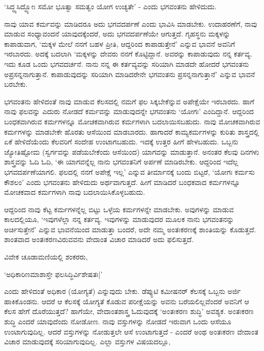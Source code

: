 `ಸಿದ್ಧ್ಯಸಿದ್ಧ್ಯೋಃ ಸಮೋ ಭೂತ್ವಾ ಸಮತ್ವಂ ಯೋಗ ಉಚ್ಯತೇ' - ಎಂದು ಭಗವಂತನು ಹೇಳಿದುದು.

ನಾವು ಯಾವ ಕರ್ಮವನ್ನು ಮಾಡಿದರೂ ಅದು ಭಗವದರ್ಪಣೆ ಎಂದು ಭಾವಿಸಿ ಮಾಡಬೇಕು. ಉದಾಹರಣೆಗೆ, ನಾವು ಮಾಡುವ ಸಂಧ್ಯಾವಂದನೆ ಯಾವುದಕ್ಕೆಂದರೆ, ಅದು ಭಗವದರ್ಪಣೆಯೇ ಆಗುತ್ತದೆ. ಗೃಹಸ್ಥನು ಮಕ್ಕಳನ್ನು ಕಾಪಾಡುವಾಗ, `ಮಕ್ಕಳ ಮೇಲೆ ನನಗೆ ಬಹಳ ಪ್ರೀತಿ, ಆದ್ದರಿಂದ ಕಾಪಾಡುತ್ತೇನೆ' ಎನ್ನುವ ಭಾವನೆ ಅವನಿಗೆ ಇರಬಾರದು. ಅದಕ್ಕೆ ಬದಲಾಗಿ `ಮಕ್ಕಳನ್ನು ದೇವರು ನನಗೆ ಕೊಟ್ಟಿದ್ದಾನೆ. ಅವರನ್ನು ಕಾಪಾಡುವುದು ನನ್ನ ಕರ್ತವ್ಯ. ಇದು ಕೂಡ ಒಂದು ಭಗವದರ್ಚನೆ. ನಾನು ನನ್ನ ಈ ಕರ್ತವ್ಯವನ್ನು ಸರಿಯಾಗಿ ಮಾಡದೇ ಹೋದರೆ ಭಗವಂತನು ಅಪ್ರಸನ್ನನಾಗುತ್ತಾನೆ. ಕಾಪಾಡುವುದನ್ನು ಸರಿಯಾಗಿ ಮಾಡಿದರೇನೇ ಭಗವಂತನು ಪ್ರಸನ್ನನಾಗುತ್ತಾನೆ' ಎನ್ನುವ ಭಾವನೆ ಬರಬೇಕು. 

ಭಗವಂತನು ಹೇಳಿದಂತೆ ನಾವು ಮಾಡುವ ಕೆಲಸದಲ್ಲಿ ನಮಗೆ ಫಲ ಸಿಕ್ಕಬೇಕೆನ್ನುವ ಅಪೇಕ್ಷೆಯೇ ಇರಬಾರದು. ಹಾಗೆ ನಾವು ಫಲವನ್ನು ಎದುರು ನೋಡದೆ ಕರ್ಮವನ್ನು ಮಾಡುವುದನ್ನೇ ಭಗವಂತನು `ಯೋಗಃ' ಎಂದಿದ್ದಾನೆ. ಆದ್ದರಿಂದ ಬಂಧಕವಾಗಿರುವ ಕರ್ಮಗಳನ್ನೂ ಮೋಚಕವಾಗಿರುವ ಕರ್ಮಗಳಾಗಿ ಬದಲಾಯಿಸಬಹುದು. ನಾವು ಮೋಚಕವಾಗಿರುವ ಕರ್ಮಗಳನ್ನು ಮಾಡಬೇಕೇ ಹೊರತು ಆಸೆಯಿಂದ ಮಾಡಬಾರದು. ಹಾಗಾದರೆ ಕಾಮ್ಯಕರ್ಮಗಳನ್ನು ಕುರಿತು ಶಾಸ್ತ್ರದಲ್ಲಿ ಏಕೆ ಹೇಳಿದೆಯೆಂದು ಕೆಲವರಿಗೆ ಸಂದೇಹ ಉಂಟಾಗಬಹುದು. ಇದಕ್ಕೆ  ಉತ್ತರ ಹೀಗೆ ಹೇಳಬಹುದು. ಒಬ್ಬನು ಜ್ಯೋತಿಷ್ಟೋಮ (ಸ್ವರ್ಗವನ್ನು ಪಡೆಯಬೇಕೆಂದು ಆಸೆಯಿಂದ) ಯಾಗವನ್ನು ಮಾಡುತ್ತಾನೆ. ಅನಂತರ ಕೆಲವು ದಿನಗಳು ಶಾಸ್ತ್ರವನ್ನು ಓದಿ ಓದಿ, `ಈ ಯಾಗವನ್ನೆಲ್ಲ ನಾನು ಭಗವಂತನಿಗೆ ಅರ್ಪಣೆ ಮಾಡಿರಬೇಕು. ಆದ್ದರಿಂದ ಇದೆಲ್ಲ ಭಗವದರ್ಪಣೆಯಾಗಲಿ. ಫಲದಲ್ಲಿ ನನಗೆ ಅಪೇಕ್ಷೆ ಇಲ್ಲ' ಎನ್ನುವ ತೀರ್ಮಾನಕ್ಕೆ ಬಂದು ಬಿಟ್ಟರೆ, `ಯೋಗಃ ಕರ್ಮಸು ಕೌಶಲಂ' ಎಂದು ಭಗವಂತನು ಹೇಳಿದುದು ಅರ್ಥವಾಗುತ್ತದೆ. ಹೀಗೆ ಮಾಡಿದರೆ ಬಂಧಕವಾದ ಕರ್ಮಗಳನ್ನೂ ಮೋಚಕವಾದ ಕರ್ಮಗಳಾಗಿ ನಾವು ಬದಲಾಯಿಸಿಕೊಳ್ಳಬಹುದು.

ಆದ್ದರಿಂದ ನಾವು ಕೆಟ್ಟ ಕರ್ಮಗಳನ್ನೆಲ್ಲ ಬಿಟ್ಟು ಒಳ್ಳೆಯ ಕರ್ಮಗಳನ್ನೇ ಮಾಡಬೇಕು. ಅವುಗಳನ್ನು ಮಾಡುವ ಕಾಲದಲ್ಲಿಯೂ, `ಇವುಗಳೆಲ್ಲಾ ನನ್ನ ಕರ್ತವ್ಯ. ಇವುಗಳನ್ನು ಮಾಡುವುದರ ಮೂಲಕ ನಾನು ಭಗವಂತನನ್ನು ಅರ್ಚಿಸುತ್ತೇನೆ' ಎನ್ನುವ ಭಾವನೆಯಿಂದ ಮಾಡುತ್ತಾ ಬಂದರೆ, ಅದೇ ನಮ್ಮ ಅಂತಃಕರಣಕ್ಕೆ ಶಾಂತಿಯನ್ನು ಕೊಡುತ್ತದೆ. ಶಾಂತವಾದ ಅಂತಃಕರಣವಿರುವವನು ವೇದಾಂತ ವಿಚಾರ ಮಾಡಿದರೆ ಅದು ಫಲಿಸುತ್ತದೆ.

ವಿವೇಕ ಚೂಡಾಮಣಿಯಲ್ಲಿ ಶಂಕರರು,

\begin{shloka}
`ಅಧಿಕಾರಿಣಮಾಶಾಸ್ತೇ ಫಲಸಿದ್ಧಿರ್ವಿಶೇಷತಃ|'
\end{shloka}

ಎಂದು ಹೇಳಿದಂತೆ ಅಧಿಕಾರ (ಯೋಗ್ಯತೆ) ಎನ್ನುವುದು ಬೇಕು. ಡೆಪ್ಯುಟಿ ಕಮೀಷನರ್ ಕೆಲಸಕ್ಕೆ ಒಬ್ಬನು ಅರ್ಜಿ ಹಾಕಿಕೊಂಡನು. ಆದರೆ ಆ ಕೆಲಸಕ್ಕೆ ಯೋಗ್ಯತೆ ಕೊಡುವ ಪರೀಕ್ಷೆಯನ್ನು ಅವನು ಬರೆಯಲಿಲ್ಲವೆಂದರೆ ಅವನಿಗೆ ಆ ಕೆಲಸ ಹೇಗೆ ದೊರೆಯುತ್ತದೆ? ಹಾಗೆಯೇ, ವೇದಾಂತಶಾಸ್ತ್ರ ಓದುವುದಕ್ಕೆ `ಅಂತಃಕರಣ ಶುದ್ಧಿ' ಅವಶ್ಯಕ. ಅಂತಃಕರಣ ಶುದ್ಧಿ ಎಂದರೆ ಯಾವುದೆಂದು ನೋಡೋಣ. ನಾವು ವಸ್ತುಗಳನ್ನು ನೋಡದೆ ಇರುವಾಗ ಒಂದು ಆಸೆಯೂ ಉಂಟಾಗುವುದಿಲ್ಲ. ಆದರೆ ವಸ್ತುಗಳನ್ನು ನೋಡುತ್ತಲೇ ಆಸೆ ಉಂಟಾಗುತ್ತದೆ - ಎಂದರೆ ಅಂಥ ಅಂತಃಕರಣ ವೇದಾಂತ ವಿಚಾರ ಮಾಡುವುದಕ್ಕೆ ಸರಿಯಾಗುವುದಿಲ್ಲ. ಎಲ್ಲಾ ವಸ್ತುಗಳ ವಿಷಯದಲ್ಲೂ,

